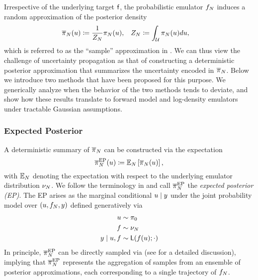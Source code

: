 \documentclass[12pt]{article}
\begin{document}
Irrespective of the underlying target $\mathsf{f}$, the probabilistic emulator $f_{N}$ 
induces a random approximation of the posterior density
\begin{align}
\overline{\pi}_{N}(u) &\coloneqq \frac{1}{Z_{N}} \pi_{N}(u),
&&Z_{N} \coloneqq \int_{\mathcal{U}} \pi_{N}(u) du, \label{eq:random-post}
\end{align}
which is referred to as the ``sample'' approximation in \citet{StuartTeck1}. We can thus
view the challenge of uncertainty propagation as that of constructing a deterministic 
posterior approximation that summarizes the uncertainty encoded in $\overline{\pi}_{N}$.
Below we introduce two methods that have been proposed for this purpose. We generically
analyze when the behavior of the two methods tends to deviate, and show how these 
results translate to forward model and log-density emulators under tractable 
Gaussian assumptions.

\subsubsection{Expected Posterior}
A deterministic summary of $\overline{\pi}_{N}$ can be constructed via the expectation 
\begin{equation}
\overline{\pi}_{N}^{\mathrm{EP}}(u) \coloneqq \mathbb{E}_{N}\left[\overline{\pi}_{N}(u) \right], \label{eq:ep-approx}
\end{equation}
with $\mathbb{E}_{N}$ denoting the expectation with respect to the underlying emulator 
distribution $\nu_{N}$.
We follow the terminology in \citet{BurknerSurrogate} and call $\overline{\pi}_{N}^{\mathrm{EP}}$ the 
\textit{expected posterior (EP)}. The EP arises as the marginal conditional $u \mid y$ under 
the joint probability model over $(u, f_{N}, y)$ defined generatively via
\begin{align}
u &\sim \pi_0 \label{eq:ep-prob-model} \\
f &\sim \nu_{N} \nonumber \\
y \mid u, f &\sim \mathsf{L}(f(u); \cdot) \nonumber
\end{align}
In principle, $\overline{\pi}_{N}^{\mathrm{EP}}$ can be directly sampled via  (see 
for a detailed discussion), implying that $\overline{\pi}_{N}^{\mathrm{EP}}$ represents the aggregation of samples 
from an ensemble of posterior approximations, each corresponding to a single trajectory of $f_{N}$.
\end{document}
